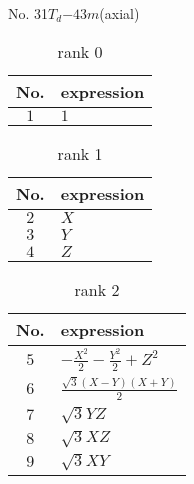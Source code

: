 \documentclass[fleqn,8pt,landscape]{jsarticle}
\begin{document}
\setcounter{MaxMatrixCols}{16}

\begin{center}
\LARGE
No. 31\quad$T_{d}$\quad$-43m$\quad[ cubic ] (axial)
\end{center}
\begin{table}[ht!]
\begin{center}
\caption{rank 0}
\renewcommand{\arraystretch}{1.3}
\begin{tabular}{cl} \hline \hline
No. & expression \\ \hline
$ 1 $ & $ 1 $ \\
 \hline \hline
\end{tabular}
\end{center}
\end{table}
\begin{table}[ht!]
\begin{center}
\caption{rank 1}
\renewcommand{\arraystretch}{1.3}
\begin{tabular}{cl} \hline \hline
No. & expression \\ \hline
$ 2 $ & $ X $ \\
$ 3 $ & $ Y $ \\
$ 4 $ & $ Z $ \\
 \hline \hline
\end{tabular}
\end{center}
\end{table}
\begin{table}[ht!]
\begin{center}
\caption{rank 2}
\renewcommand{\arraystretch}{1.3}
\begin{tabular}{cl} \hline \hline
No. & expression \\ \hline
$ 5 $ & $ - \frac{X^{2}}{2} - \frac{Y^{2}}{2} + Z^{2} $ \\
$ 6 $ & $ \frac{\sqrt{3} \left(X - Y\right) \left(X + Y\right)}{2} $ \\
$ 7 $ & $ \sqrt{3} Y Z $ \\
$ 8 $ & $ \sqrt{3} X Z $ \\
$ 9 $ & $ \sqrt{3} X Y $ \\
 \hline \hline
\end{tabular}
\end{center}
\end{table}
\end{document}
